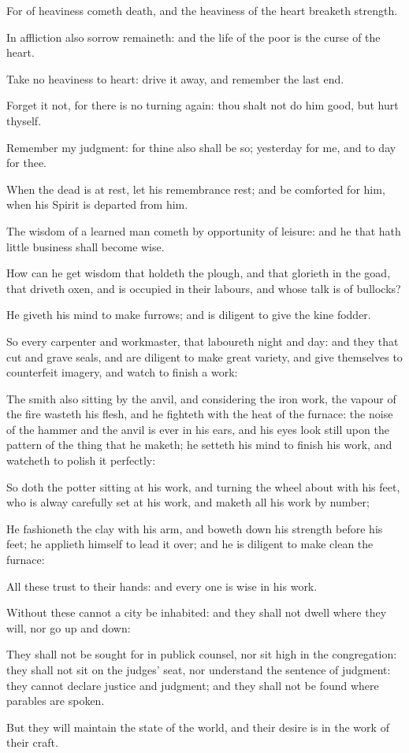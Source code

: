 {\par }{\PP {}For of heaviness cometh death, and the heaviness of the heart breaketh strength.
\par }{\PP {}In affliction also sorrow remaineth: and the life of the poor is the curse of the heart.
\par }{\PP {}Take no heaviness to heart: drive it away, and remember the last end.
\par }{\PP {}Forget it not, for there is no turning again: thou shalt not do him good, but hurt thyself.
\par }{\PP {}Remember my judgment: for thine also shall be so; yesterday for me, and to day for thee.
\par }{\PP {}When the dead is at rest, let his remembrance rest; and be comforted for him, when his Spirit is departed from him.
\par }{\PP {}The wisdom of a learned man cometh by opportunity of leisure: and he that hath little business shall become wise.
\par }{\PP {}How can he get wisdom that holdeth the plough, and that glorieth in the goad, that driveth oxen, and is occupied in their labours, and whose talk is of bullocks?
\par }{\PP {}He giveth his mind to make furrows; and is diligent to give the kine fodder.
\par }{\PP {}So every carpenter and workmaster, that laboureth night and day: and they that cut and grave seals, and are diligent to make great variety, and give themselves to counterfeit imagery, and watch to finish a work:
\par }{\PP {}The smith also sitting by the anvil, and considering the iron work, the vapour of the fire wasteth his flesh, and he fighteth with the heat of the furnace: the noise of the hammer and the anvil is ever in his ears, and his eyes look still upon the pattern of the thing that he maketh; he setteth his mind to finish his work, and watcheth to polish it perfectly:
\par }{\PP {}So doth the potter sitting at his work, and turning the wheel about with his feet, who is alway carefully set at his work, and maketh all his work by number;
\par }{\PP {}He fashioneth the clay with his arm, and boweth down his strength before his feet; he applieth himself to lead it over; and he is diligent to make clean the furnace:
\par }{\PP {}All these trust to their hands: and every one is wise in his work.
\par }{\PP {}Without these cannot a city be inhabited: and they shall not dwell where they will, nor go up and down:
\par }{\PP {}They shall not be sought for in publick counsel, nor sit high in the congregation: they shall not sit on the judges’ seat, nor understand the sentence of judgment: they cannot declare justice and judgment; and they shall not be found where parables are spoken.
\par }{\PP {}But they will maintain the state of the world, and
{} their desire is in the work of their craft.

}
